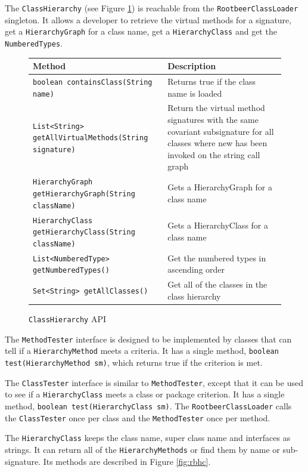 \documentclass{sigplanconf}
\begin{document}
The {\tt ClassHierarchy} (see Figure \ref{fig:rbch}) is reachable from the {\tt RootbeerClassLoader} singleton. It allows a developer to retrieve the virtual methods for a signature, get a {\tt HierarchyGraph} for a class name, get a {\tt HierarchyClass} and get the {\tt NumberedTypes}.

\begin{figure}[htbf]
\begin{tabularx}{\textwidth}{|XX|}
\hline
{\bf Method} & {\bf Description }\\\hline
{\tt boolean containsClass(String name)} & Returns true if the 
    class name is loaded \\\hline
{\tt List<String> getAllVirtualMethods(String signature)} & 
    Return the virtual method signatures with the same 
    covariant subsignature for all classes where new has been 
    invoked on the string call graph\\\hline
{\tt HierarchyGraph getHierarchyGraph(String className)} & 
    Gets a HierarchyGraph for a class name\\\hline
{\tt HierarchyClass getHierarchyClass(String className)} & 
    Gets a HierarchyClass for a class name\\\hline 
{\tt List<NumberedType> getNumberedTypes()} & Get the 
    numbered types in ascending order\\\hline
{\tt Set<String> getAllClasses()} & Get all of the classes in the
    class hierarchy\\\hline
\end{tabularx}
\caption{{\tt ClassHierarchy} API}
\label{fig:rbch}
\end{figure}


The {\tt MethodTester} interface is designed to be implemented by classes that can tell if a {\tt HierarchyMethod} meets a criteria. It has a single method, {\tt boolean test(HierarchyMethod sm)}, which returns true if the criterion is met.

The {\tt ClassTester} interface is similar to {\tt MethodTester}, except that it can be used to see if a {\tt HierarchyClass} meets a class or package criterion. It has a single method, {\tt boolean test(Hierarchy\-Class sm)}. The {\tt RootbeerClassLoader} calls the {\tt ClassTester} once per class and the {\tt MethodTester} once per method.

The {\tt HierarchyClass} keeps the class name, super class name and interfaces as strings. It can return all of the {\tt HierarchyMethods} or find them by name or sub-signature. Its methods are described in Figure \ref{fig:rbhc}.
\end{document}
